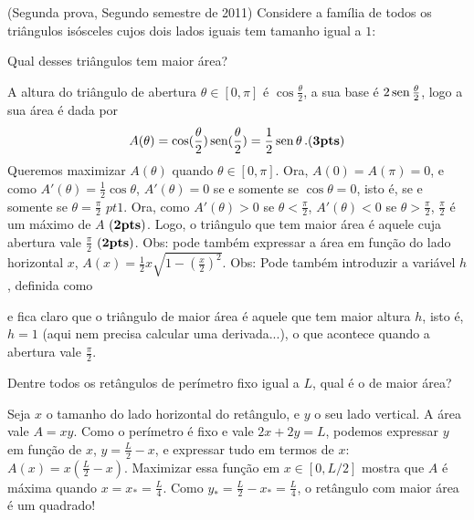 \begin{exo}(Segunda prova, Segundo semestre de 2011)
Considere a família de todos os triângulos isósceles cujos dois lados iguais
tem tamanho igual a $1$:
\begin{center}
\begin{bmlimage}\end{bmlimage}
\end{center}
Qual desses triângulos tem maior área? 
\begin{sol}
A altura do triângulo de abertura
$\theta\in [0,\pi]$ é $\cos \frac{\theta}{2}$, a sua base é $2\operatorname{sen}
\frac{\theta}{2}$, logo a sua área é dada por
$$A(\theta)=\cos(\frac{\theta}{2})\operatorname{sen} (\frac{\theta}{2})=\frac12 \operatorname{sen}
\theta\,.(\mathbf{3}{\text{\bf pts}})$$
Queremos maximizar $A(\theta)$ quando $\theta\in [0,\pi]$.
Ora, $A(0)=A(\pi)=0$, e como $A'(\theta)=\frac12\cos \theta$,
$A'(\theta)=0$ se e somente se $\cos
\theta=0$, isto é, se e somente se $\theta=\frac{\pi}{2}$ $pt{1}$. Ora, como
$A'(\theta)>0$ se $\theta<\frac{\pi}{2}$, 
$A'(\theta)<0$ se $\theta>\frac{\pi}{2}$, $\frac{\pi}{2}$ é um máximo de $A$
$(\mathbf{2}{\text{\bf pts}})$. 
Logo, {o triângulo que tem maior área é aquele cuja abertura vale
$\frac{\pi}{2}$ $(\mathbf{2}{\text{\bf pts}})$.} Obs: pode também expressar a área em função do lado
horizontal $x$, $A(x)=\tfrac12 x\sqrt{1-(\tfrac{x}{2})^2}$.
Obs: Pode também introduzir a variável $h$, definida como
\begin{center}
\begin{bmlimage}\end{bmlimage}
\end{center}
e fica claro que o triângulo de maior área é aquele que tem maior altura $h$,
isto é, $h=1$ (aqui nem precisa calcular uma derivada...), o que acontece quando
a abertura vale $\frac{\pi}{2}$.
\end{sol}
\end{exo}

\begin{exo}
Dentre todos os retângulos de perímetro fixo igual a $L$, qual é o de maior
área?
\begin{sol}
Seja $x$ o tamanho do lado horizontal do retângulo, e $y$ o seu lado vertical.
A área vale $A=xy$.
Como o perímetro é fixo e vale $2x+2y=L$, podemos expressar $y$ em função de
$x$, $y=\frac{L}{2}-x$, e expressar tudo em termos de $x$:
$A(x)=x(\frac{L}{2}-x)$. Maximizar essa função em $x\in [0,L/2]$ mostra que $A$
é máxima quando $x=x_*=\frac{L}{4}$. Como $y_*=\frac{L}{2}-x_*=\frac{L}{4}$, o
retângulo com maior área é um quadrado!
\end{sol}
\end{exo}


